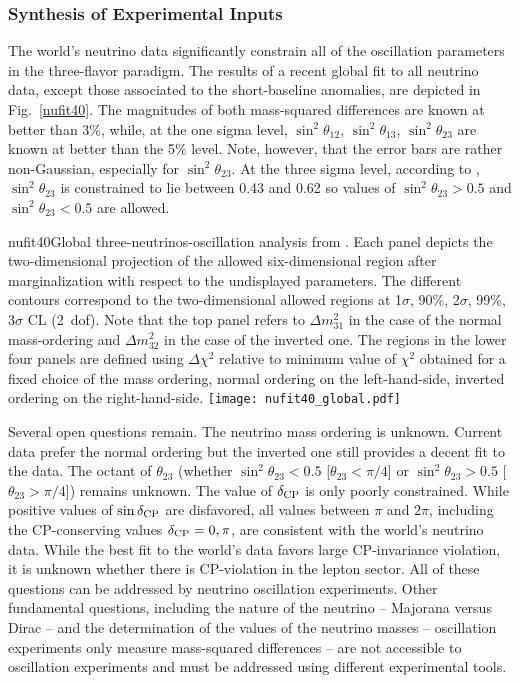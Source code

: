 \subsubsection{Synthesis of Experimental Inputs} 

The world's neutrino data significantly constrain all of the oscillation parameters in the three-flavor paradigm. The results of a recent global fit \cite{Esteban:2018azc} to all neutrino data, except those associated to the short-baseline anomalies, are depicted in Fig.~\ref{nufit40}. The magnitudes of both mass-squared differences are known at better than 3\%, while, at the one sigma level, $\sin^2\theta_{12}$, $\sin^2\theta_{13}$, $\sin^2\theta_{23}$ are known at better than the 5\% level. Note, however, that the error bars are rather non-Gaussian, especially for $\sin^2\theta_{23}$. At the three sigma level,  according to \cite{Esteban:2018azc}, $\sin^2\theta_{23}$ is constrained to lie between 0.43 and 0.62 so values of $\sin^2\theta_{23}>0.5$ and $\sin^2\theta_{23}<0.5$ are allowed.
\begin{dunefigure}{nufit40}{Global three-neutrinos-oscillation analysis from \cite{Esteban:2018azc}. Each panel depicts the two-dimensional projection of the allowed six-dimensional region after marginalization with respect to the undisplayed parameters. The different contours correspond to the two-dimensional allowed regions at 1$\sigma$, 90\%, 2$\sigma$, 99\%, 3$\sigma$ CL (2~dof). Note that the top panel refers to $\Delta m^2_{31}$ in the case of the normal mass-ordering and $\Delta m^2_{32}$ in the case of the inverted one. The regions in the lower four panels are defined using $\Delta \chi^2$ relative to minimum value of $\chi^2$ obtained for a fixed choice of the mass ordering, normal ordering on the left-hand-side, inverted ordering on the right-hand-side.
}
  \texttt{[image: nufit40\_global.pdf]}
\end{dunefigure}

Several open questions remain. The neutrino mass ordering is unknown. Current data prefer the normal ordering but the inverted one still provides a decent fit to the data. The octant of $\theta_{23}$ (whether $\sin^2\theta_{23}<0.5$ [$\theta_{23}<\pi/4$] or $\sin^2\theta_{23}>0.5$ [$\theta_{23}>\pi/4$]) remains unknown. The value of $\delta_{\rm CP}$ is only poorly constrained. While positive values of $\sin\delta_{\rm CP}$ are disfavored, all values between $\pi$ and $2\pi$, including the CP-conserving values $\delta_{\rm CP}=0,\pi$, are consistent with the world's neutrino data. While the best fit to the world's data favors large CP-invariance violation, it is unknown whether there is CP-violation in the lepton sector. All of these questions can be addressed by neutrino oscillation experiments. Other fundamental questions, including the nature of the neutrino -- Majorana versus Dirac -- and the determination of the values of the neutrino masses -- oscillation experiments only measure mass-squared differences -- are not accessible to oscillation experiments and must be addressed using different experimental tools.  

